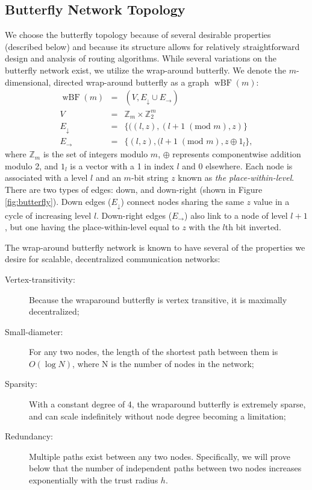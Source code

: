 \documentclass{sig-alternate-05-2015}
\newcommand{\beq}{\begin{eqnarray}}
\newcommand{\eeq}{\end{eqnarray}}
\DeclareMathOperator{\wbf}{wBF}
\begin{document}
\subsection{Butterfly Network Topology}

We choose the butterfly topology
\cite{kshemkalyani_distributed_2008}
because of several desirable properties (described below)
and because its structure allows for relatively straightforward
design and analysis of routing algorithms.
While several variations on the butterfly network exist,
we utilize the wrap-around butterfly.
We denote the $m$-dimensional, directed wrap-around butterfly as a
graph $\wbf(m)$:
\beq
\wbf(m) &=& (V, E_\downarrow \cup E_\rightarrow) \\
V &=& \mathbb{Z}_{m} \times \mathbb{Z}_2^m \\
E_\downarrow
&=&
\{((l,z),(l+1 \; (\text{mod } m),z) \} \\
E_\rightarrow
&=&
\{(l,z),(l+1 \; (\text{mod } m),
z \oplus 1_l \},
\eeq
where $\mathbb{Z}_m$ is the set of integers modulo $m$,
$\oplus$ represents componentwise addition modulo 2,
and $1_l$ is a vector with a 1 in index $l$ and 0 elsewhere.
Each node is associated with a level $l$ and an $m$-bit string $z$
known as {\em the place-within-level}.
There are two types of edges: down, and down-right
(shown in Figure \ref{fig:butterfly}).
Down edges ($E_\downarrow$) connect nodes sharing the same $z$ value
in a cycle of increasing level $l$.
Down-right edges ($E_\rightarrow$) also link to a node of level $l + 1$,
but one having the place-within-level equal to $z$ with the $l$th bit inverted.

The wrap-around butterfly network is known to have several of the properties
we desire for scalable, decentralized communication networks:
\begin{description}
\item[Vertex-transitivity:]
Because the wraparound butterfly is vertex transitive,
it is maximally decentralized;
\item[Small-diameter:]
For any two nodes, the length of the shortest path between them is
$O(\log N)$, where N is the number of nodes in the network;
\item[Sparsity:]
With a constant degree of 4, the wraparound butterfly is extremely sparse,
and can scale indefinitely without node degree becoming a limitation;
\item [Redundancy:]
Multiple paths exist between any two nodes.
Specifically, we will prove below that the number of independent paths between two
nodes increases exponentially with the trust
radius $h$.
\end{description}
\end{document}

